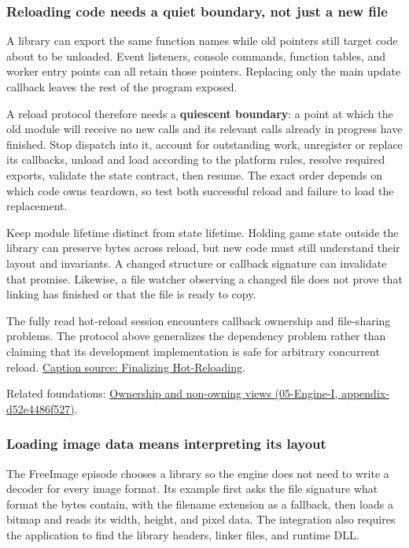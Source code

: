 \subsubsection{Reloading code needs a quiet boundary, not just a new file}\label{06-engine-ii-ch027-reloading-code-needs-a-quiet-boundary-not-just-a-new-file}

A library can export the same function names while old pointers still target code about to be unloaded. Event listeners, console commands, function tables, and worker entry points can all retain those pointers. Replacing only the main update callback leaves the rest of the program exposed.

A reload protocol therefore needs a \textbf{quiescent boundary}: a point at which the old module will receive no new calls and its relevant calls already in progress have finished. Stop dispatch into it, account for outstanding work, unregister or replace its callbacks, unload and load according to the platform rules, resolve required exports, validate the state contract, then resume. The exact order depends on which code owns teardown, so test both successful reload and failure to load the replacement.

Keep module lifetime distinct from state lifetime. Holding game state outside the library can preserve bytes across reload, but new code must still understand their layout and invariants. A changed structure or callback signature can invalidate that promise. Likewise, a file watcher observing a changed file does not prove that linking has finished or that the file is ready to copy.

The fully read hot-reload session encounters callback ownership and file-sharing problems. The protocol above generalizes the dependency problem rather than claiming that its development implementation is safe for arbitrary concurrent reload. \href{https://www.youtube.com/watch?v=U1C9mMrpyF4}{Caption source: Finalizing Hot-Reloading}.

Related foundations: \href{../05-Engine-I/main.pdf\#nameddest=appendix-d52e4486f527}{Ownership and non-owning views (05-Engine-I, appendix-d52e4486f527)}.

\subsubsection{Loading image data means interpreting its layout}\label{06-engine-ii-ch027-loading-image-data-means-interpreting-its-layout}

The FreeImage episode chooses a library so the engine does not need to write a decoder for every image format. Its example first asks the file signature what format the bytes contain, with the filename extension as a fallback, then loads a bitmap and reads its width, height, and pixel data. The integration also requires the application to find the library headers, linker files, and runtime DLL.

